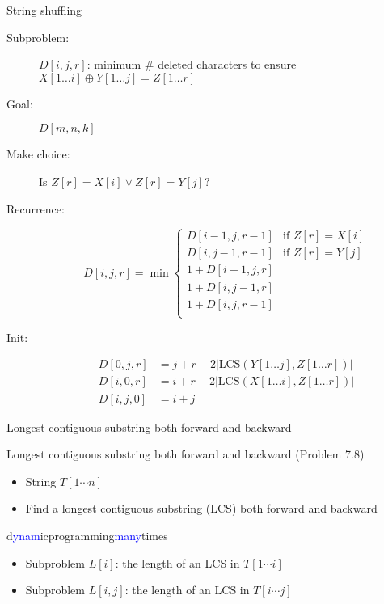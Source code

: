 \begin{frame}{String shuffling}
  \begin{description}
	\item[Subproblem:] $D[i,j,r]$: minimum \# deleted characters to ensure $X[1 \dots i] \oplus Y[1 \dots j] = Z[1 \dots r]$
	\item[Goal:] $D[m,n,k]$
	  \pause
	\item[Make choice:] Is $Z[r] = X[i] \lor Z[r] = Y[j]$?
	\item[Recurrence:] 
	  \[
		D[i,j,r] = \min \left\{ \begin{array}{ll}
		  D[i-1, j, r-1] & \text{if } Z[r] = X[i] \\
		  D[i, j-1, r-1] & \text{if } Z[r] = Y[j] \\
		  1 + D[i-1, j, r] & \\
		  1 + D[i, j-1, r] & \\
		  1 + D[i, j, r-1] & \\
		\end{array} \right.
	  \]
	  \pause
	\item[Init:]
	  \begin{align*}
		D[0,j,r] &= j + r - 2|\text{LCS}(Y[1 \dots j], Z[1 \dots r])| \\
		D[i,0,r] &=	i + r - 2|\text{LCS}(X[1 \dots i], Z[1 \dots r])| \\
		D[i,j,0] &= i + j
	  \end{align*}
  \end{description}
\end{frame}
\begin{frame}{Longest contiguous substring both forward and backward}
  \begin{exampleblock}{Longest contiguous substring both forward and backward (Problem 7.8)}
    \begin{itemize}
      \item String $T[1 \cdots n]$
      \item Find a longest contiguous substring (LCS) both forward and backward
    \end{itemize}
  \end{exampleblock}

  \begin{center}
	d\textcolor{blue}{ynam}icprogramming\textcolor{blue}{many}times
  \end{center}

  \begin{itemize}
	\item Subproblem $L[i]$: the length of an LCS in $T[1 \cdots i]$
	\item Subproblem $L[i,j]$: the length of an LCS in $T[i \cdots j]$
  \end{itemize}
\end{frame}
